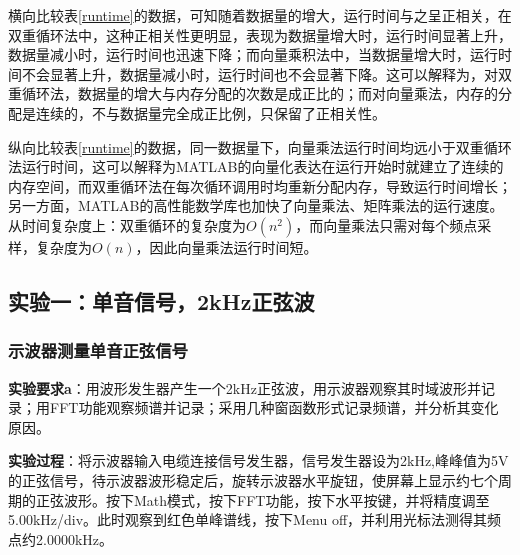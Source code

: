 \documentclass[12pt]{article}
\begin{document}
横向比较表\ref{runtime}的数据，可知随着数据量的增大，运行时间与之呈正相关，在双重循环法中，这种正相关性更明显，表现为数据量增大时，运行时间显著上升，数据量减小时，运行时间也迅速下降；而向量乘积法中，当数据量增大时，运行时间不会显著上升，数据量减小时，运行时间也不会显著下降。这可以解释为，对双重循环法，数据量的增大与内存分配的次数是成正比的；而对向量乘法，内存的分配是连续的，不与数据量完全成正比例，只保留了正相关性。

纵向比较表\ref{runtime}的数据，同一数据量下，向量乘法运行时间均远小于双重循环法运行时间，这可以解释为MATLAB的向量化表达在运行开始时就建立了连续的内存空间，而双重循环法在每次循环调用时均重新分配内存，导致运行时间增长；另一方面，MATLAB的高性能数学库也加快了向量乘法、矩阵乘法的运行速度。从时间复杂度上：双重循环的复杂度为$O(n^2)$，而向量乘法只需对每个频点采样，复杂度为$O(n)$，因此向量乘法运行时间短。




\subsection{实验一：单音信号，2kHz正弦波}
\subsubsection{示波器测量单音正弦信号}
\textbf{实验要求a}：用波形发生器产生一个2kHz正弦波，用示波器观察其时域波形并记录；用FFT功能观察频谱并记录；采用几种窗函数形式记录频谱，并分析其变化原因。

\textbf{实验过程}：将示波器输入电缆连接信号发生器，信号发生器设为2kHz,峰峰值为5V的正弦信号，待示波器波形稳定后，旋转示波器水平旋钮，使屏幕上显示约七个周期的正弦波形。按下Math模式，按下FFT功能，按下水平按键，并将精度调至5.00kHz/div。此时观察到红色单峰谱线，按下Menu off，并利用光标法测得其频点约2.0000kHz。
\end{document}
